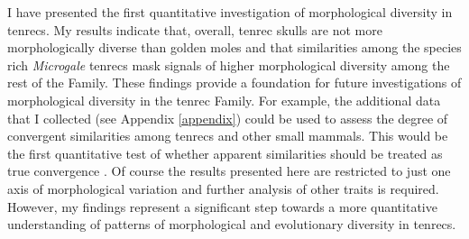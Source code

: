 	I have presented the first quantitative investigation of morphological diversity in tenrecs. My results indicate that, overall, tenrec skulls are not more morphologically diverse than golden moles and that similarities among the species rich \textit{Microgale} tenrecs mask signals of higher morphological diversity among the rest of the Family. These findings provide a foundation for future investigations of morphological diversity in the tenrec Family. For example, the additional data that I collected (see Appendix \ref{appendix}) could be used to assess the degree of convergent similarities among tenrecs and other small mammals. This would be the first quantitative test of whether apparent similarities \citep{Olson2013, Soarimalala2011, Eisenberg1969} should be treated as true convergence \citep[e.g.][]{Losos2011, Stayton2008}.
	Of course the results presented here are restricted to just one axis of morphological variation and further analysis of other traits is required. However, my findings represent a significant step towards a more quantitative understanding of patterns of morphological and evolutionary diversity in tenrecs. 









